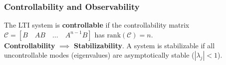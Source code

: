 


    
    

\subsubsection{Controllability and Observability}
The LTI system is \textbf{controllable} if the controllability matrix 
$\mathcal{C} = [B \quad AB \quad \dots \quad A^{n-1}B]$ has $\text{rank}(\mathcal{C}) = n$. 
\\ \textbf{Controllability} $\implies$ \textbf{Stabilizability}. A system is stabilizable if all uncontrollable modes (eigenvalues) are asymptotically stable ($|\lambda_j| < 1$).

